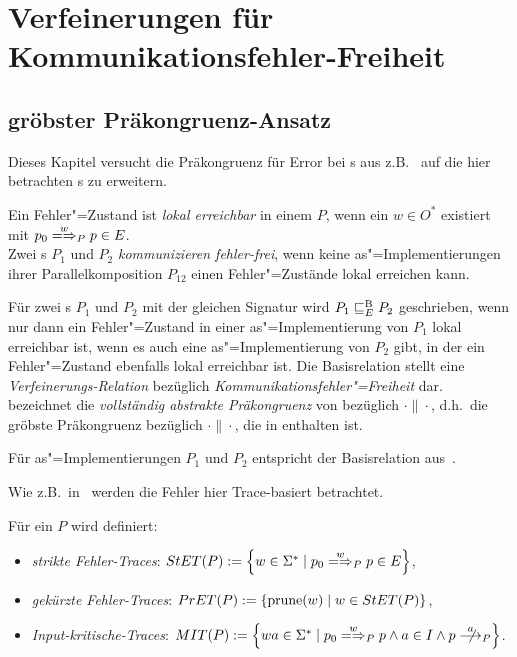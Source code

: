 \chapter{Verfeinerungen für Kommunikationsfehler-Freiheit}

\section{gröbster Präkongruenz-Ansatz}

Dieses Kapitel versucht die Präkongruenz für Error bei \EIO{}s aus
z.B.~\cite{Schinko2016BA} auf die hier betrachten \MEIO{}s zu erweitern.

\begin{Def}
  Ein Fehler"=Zustand ist \emph{lokal erreichbar} in einem \MEIO{} $P$, wenn
  ein $w\in O^*$ existiert mit $p_0 \weakmay[w]_{P} p\in E$.\\
  Zwei \MEIO{}s $P_1$ und $P_2$ \emph{kommunizieren fehler-frei}, wenn keine
  as"=Implementierungen ihrer Parallelkomposition $P_{12}$ einen
  Fehler"=Zustände lokal erreichen kann.
\end{Def}

\vspace{0.2cm}

\begin{Def}
  \label{EBRelDef}
  Für zwei \MEIO{}s $P_1$ und $P_2$ mit der gleichen Signatur wird $P_1 \sqsubseteq  _E^\mathrm{B}{}
  P_2$ geschrieben, wenn nur dann ein Fehler"=Zustand in einer
  as"=Implementierung von $P_1$ lokal erreichbar ist, wenn es auch eine
  as"=Implementierung von $P_2$ gibt, in der ein Fehler"=Zustand ebenfalls
  lokal erreichbar ist. Die Basisrelation stellt eine
  \emph{Verfeinerungs-Relation} bezüglich \emph{Kommunikationsfehler"=Freiheit}
  dar.\\
  \ECRel{} bezeichnet die \emph{vollständig abstrakte Präkongruenz} von
  \EBRel{} bezüglich $\cdot\|\cdot$, d.h.\ die gröbste Präkongruenz bezüglich
  $\cdot\|\cdot$, die in \EBRel{} enthalten ist.
\end{Def}

Für as"=Implementierungen $P_1$ und $P_2$ entspricht \EBRel{} der Basisrelation
\EBbaRel{} aus~\cite{Schinko2016BA}.

Wie z.B.\ in~\cite{Schinko2016BA} werden die Fehler hier Trace-basiert
betrachtet.

\begin{Def}
  \label{KommTracesDef}
  Für ein \MEIO{} $P$ wird definiert:
  \begin{itemize}
    \item \emph{strikte Fehler-Traces}: $\StET (P) :=
      \left\{w\in\Sigma ^* \mid p_0 \weakmay[w]_P p \in E\right\}$,
    \item \emph{gekürzte Fehler-Traces}: $PrET (P) :=
      \left\{\mathrm{prune} (w) \mid w\in StET (P)\right\}$,
    \item \emph{Input-kritische-Traces}: $\MIT (P) := \left\{wa\in\Sigma ^*
      \mid p_0 \weakmay[w]_P p \land a\in I\land p\nmust[a]_P \right\}$.
  \end{itemize}
\end{Def}

